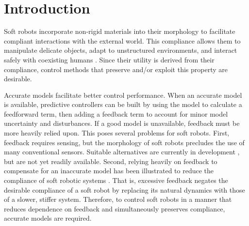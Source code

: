 \section{Introduction}
\label{sec:intro}

Soft robots incorporate non-rigid materials into their morphology to facilitate compliant interactions with the external world.
This compliance allows them to manipulate delicate objects, adapt to unstructured environments, and interact safely with coexisting humans 
\cite{rus2015design}. 
Since their utility is derived from their compliance, control methods that preserve and/or exploit this property are desirable. 

Accurate models facilitate better control performance.
When an accurate model is available, predictive controllers can be built by using the model to calculate a feedforward term, then adding a feedback term to account for minor model uncertainty and disturbances.
If a good model is unavailable, feedback must be more heavily relied upon.
This poses several problems for soft robots.
First, feedback requires sensing, but the morphology of soft robots precludes the use of many conventional sensors.
Suitable alternatives are currently in development , but are not yet readily available.
Second, relying heavily on feedback to compensate for an inaccurate model has been illustrated to reduce the compliance of soft robotic systems \cite{della2017controlling}.
That is, excessive feedback negates the desirable compliance of a soft robot by replacing its natural dynamics with those of a slower, stiffer system.
Therefore, to control soft robots in a manner that reduces dependence on feedback and simultaneously preserves compliance, accurate models are required.

